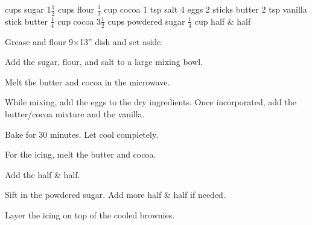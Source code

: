 \dishtype{\dessert}
\dishother{\vegetarian}
\begin{ingreds}
     cups sugar
        1$\frac{1}{2}$ cups flour
        $\frac{1}{3}$ cup cocoa 
        1 tsp salt
        4 eggs
        2 sticks butter
        2 tsp vanilla
    \columnbreak{}
     stick butter
        $\frac{1}{4}$ cup cocoa
        3$\frac{1}{2}$ cups powdered sugar
        $\frac{1}{4}$ cup half \& half
\end{ingreds}
\begin{method}
    Grease and flour 9$\times$13'' dish and set aside.\par
    Add the sugar, flour, and salt to a large mixing bowl.\par
    Melt the butter and cocoa in the microwave.\par
    While mixing, add the eggs to the dry ingredients. Once incorporated, add the butter/cocoa mixture and the vanilla.\par
    Bake for 30 minutes. Let cool completely.\par
    For the icing, melt the butter and cocoa.\par
    Add the half \& half.\par
    Sift in the powdered sugar. Add more half \& half if needed.\par
    Layer the icing on top of the cooled brownies.    
\end{method}